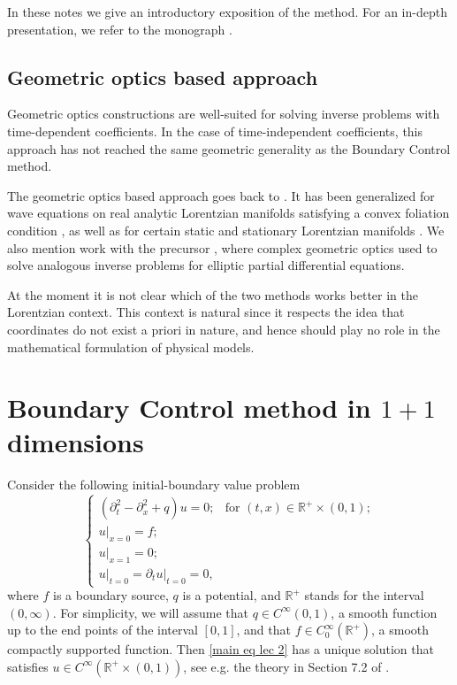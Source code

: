 \documentclass[12pt,oneside,final]{amsart}
\def\R{\mathbb R}
\begin{document}
In these notes we give an introductory exposition of the method. For an in-depth presentation, we refer to the monograph \cite{Matti}. 

\subsection{Geometric optics based approach}




Geometric optics constructions are well-suited for solving inverse problems with time-dependent coefficients. In the case of time-independent coefficients, this approach has not reached the same geometric generality as the Boundary Control method.  

The geometric optics based approach goes back to \cite{StefanovZ}. It has been generalized for wave equations on real analytic Lorentzian manifolds satisfying a convex foliation condition \cite{SY, Stefanov1}, as well as for certain static and stationary  Lorentzian manifolds \cite{FIKO,FIO}.  We also mention work \cite{SylvesterUhlmann} with the precursor \cite{Calderon}, where complex geometric optics used to solve analogous inverse problems for elliptic partial differential equations. 

At the moment it is not clear which of the two methods works better in the Lorentzian context. This context is natural since it respects the idea that coordinates do not exist a priori in nature, and hence should play no role in the mathematical formulation of physical models. 



\section{Boundary Control method in $1+1$ dimensions}

Consider the following  initial-boundary value problem
\begin{equation}\label{main eq lec 2}
	\begin{cases}
		(\partial_t^2 - \partial_x^2 + q) u = 0; & \text{for } (t,x) \in \mathbb{R}^+\times (0,1);\\
		\left. u\right|_{x=0} = f;\\
		\left. u\right|_{x=1} = 0;\\
		\left. u\right|_{t=0} = \left. \partial_t u\right|_{t=0} = 0,
	\end{cases}
\end{equation}
where $f$ is a boundary source, $q$ is a potential, and $\R^+$ stands for the interval $(0, \infty)$. 
For simplicity, we will assume that $q \in C^\infty(0,1)$, a smooth function up to the end points of the interval $[0,1]$, and that $f \in C_0^\infty(\R^+)$, a smooth compactly supported function. Then \eqref{main eq lec 2} has a unique solution that satisfies $u \in C^\infty(\R^+ \times (0,1))$, see e.g. the theory in Section 7.2 of \cite{Evans1998}.
\end{document}
